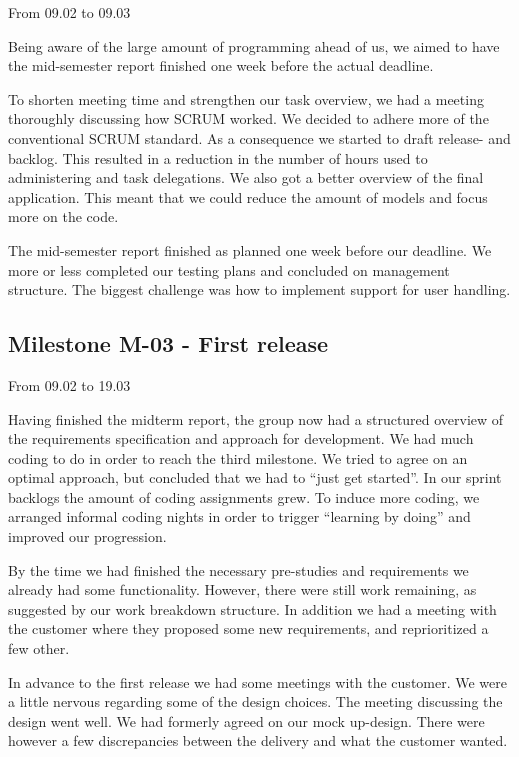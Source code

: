 From 09.02 to 09.03

Being aware of the large amount of programming ahead of us, we aimed to
have the mid-semester report finished one week before the actual
deadline.




To shorten meeting time and strengthen our task overview, we had a
meeting thoroughly discussing how SCRUM worked. We decided to adhere
more of the conventional SCRUM standard. As a consequence we started to
draft release- and backlog. This resulted in a reduction in the number
of hours used to administering and task delegations. We also got a
better overview of the final application. This meant that we could
reduce the amount of models and focus more on the code. 




The mid-semester report finished as planned one week before our
deadline. We more or less completed our testing plans and concluded on
management structure. The biggest challenge was how to implement
support for user handling. 




\subsection{Milestone M-03 - First release}

From 09.02 to 19.03

Having finished the midterm report, the group now had a structured
overview of the requirements specification and approach for
development. We had much coding to do in order to reach the third
milestone. We tried to agree on an optimal approach, but concluded that
we had to ``just get started''. In
our sprint backlogs the amount of coding assignments grew. To induce
more coding, we arranged informal coding nights in order to trigger
``learning by doing'' and improved
our progression.




By the time we had finished the necessary pre-studies and requirements
we already had some functionality. However, there were still work
remaining, as suggested by our work breakdown structure. In addition we
had a meeting with the customer where they proposed some new
requirements, and reprioritized a few other. 




In advance to the first release we had some meetings with the customer.
We were a little nervous regarding some of the design choices. The
meeting discussing the design went well. We had formerly agreed on our
mock up-design. There were however a few discrepancies between the
delivery and what the customer wanted. \ 




